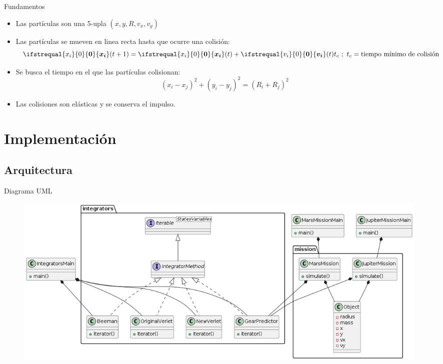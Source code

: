 \documentclass{beamer}
\renewcommand\vec[1]{\ifstrequal{#1}{0}{\ensuremath{\mathbf{0}}}{\ensuremath{\boldsymbol{#1}}}}
\begin{document}
            \begin{frame}{Fundamentos}
                \begin{itemize}
                    \item Las partículas son una 5-upla $(x, y, R, v_x, v_y)$
                    \item Las partículas se mueven en linea recta hasta que ocurre una colisión:
                        \begin{equation*}
                            \vec{x_i}(t+1) = \vec{x_i}(t) + \vec{v_i}(t) t_c\ ; \ t_c = \text{tiempo mínimo de colisión}
                        \end{equation*}
                    \item Se busca el tiempo en el que las partículas colisionan:
                        \begin{equation*}
                            \left( x_i - x_j \right) ^2 + \left( y_i - y_j \right) ^2 = \left( R_i + R_j \right) ^2
                        \end{equation*}
                    \item Las colisiones son elásticas y se conserva el impulso.
                \end{itemize}
            \end{frame}

    \section{Implementación}

        \subsection{Arquitectura}

            \begin{frame}{Diagrama UML}
                \begin{figure}[htbp]
                    \centering
                    \includegraphics[width=\textwidth]{./architecture}
                    \label{fig:architecture}
                \end{figure}
            \end{frame}
\end{document}
